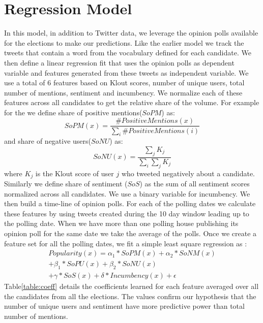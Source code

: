 \section{Regression Model}
In this model, in addition to Twitter data, we leverage the opinion polls available for the elections to make our predictions.
Like the earlier model we track the tweets that contain a word from the vocabulary defined for each candidate.
We then define a linear regression fit that uses the opinion polls as dependent variable and features generated from these tweets as independent variable.
We use a total of 6 features based on Klout scores, number of unique users, total number of mentions, sentiment and incumbency.
We normalize each of these features across all candidates to get the relative share of the volume. 
For example for the we define share of positive mentions($SoPM$)  as: 
\begin{equation}
SoPM(x) = \frac{\#PositiveMentions(x)}{\sum_i \#PositiveMentions(i)} 
\end{equation}
and share of negative users($SoNU$) as:
\begin{equation}
SoNU(x) = \frac{\sum_j K_j}{\sum_i \sum_j K_j}
\end{equation}
where $K_j$ is the Klout score of user $j$ who tweeted negatively about a candidate.
Similarly we define share of sentiment ($SoS$) as the sum of all sentiment scores normalized across all candidates. 
We use a binary variable for incumbency. 
We then build a time-line of opinion polls. 
For each of the polling dates we calculate these features by using tweets created during the 10 day window leading up to the polling date.
When we have more than one polling house publishing its opinion poll for the same date we take the average of the polls. 
Once we create a feature set for all the polling dates, we fit a simple least square regression as :
\begin{equation}
\begin{split}
Popularity(x) = \alpha_1 * SoPM(x) + \alpha_2 * SoNM(x) \\
						 + \beta_1 * SoPU(x) + \beta_2 * SoNU(x) \\
						 + \gamma * SoS(x) + \delta * Incumbency(x) + \epsilon
\end{split}
\end{equation}
Table\ref{table:coeff} details the coefficients learned for each feature averaged over all the candidates from all the elections.
The values confirm our hypothesis that the number of unique users and sentiment have more predictive power than total number of mentions.
